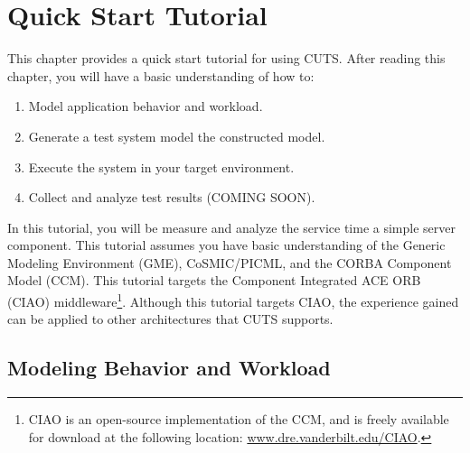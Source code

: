 
\chapter{Quick Start Tutorial}
\label{chap:tutorial}

This chapter provides a quick start tutorial for using CUTS. After 
reading this chapter, you will have a basic understanding of how to:
\begin{enumerate}
  \item Model application behavior and workload.

  \item Generate a test system model the constructed model.

  \item Execute the system in your target environment.

  \item Collect and analyze test results (COMING SOON).
\end{enumerate}

In this tutorial, you will be measure and analyze the service time 
a simple server component. This tutorial assumes you have basic 
understanding of the Generic Modeling Environment (GME), CoSMIC/\-PICML, 
and the CORBA Component Model (CCM). This tutorial targets the 
Component Integrated ACE ORB (CIAO) middleware\footnote{CIAO is 
an open-source implementation of the CCM, and is freely available 
for download at the following location: \url{www.dre.vanderbilt.edu/CIAO}.}. 
Although this tutorial targets CIAO, the experience gained can be 
applied to other architectures that CUTS supports.

\section{Modeling Behavior and Workload}
\label{sec:quickstart-modeling}

